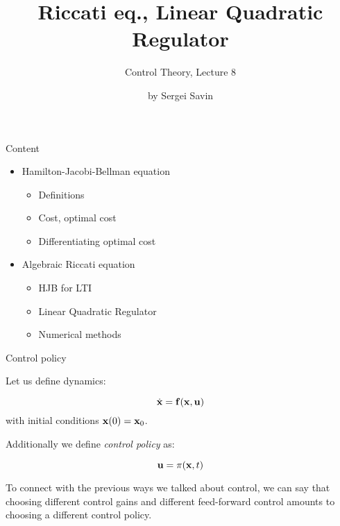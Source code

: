 \documentclass{beamer}
\title{Riccati eq., Linear Quadratic Regulator}
\subtitle{Control Theory, Lecture 8}
\author{by Sergei Savin}
\date{\mydate}
\begin{document}
\maketitle


\begin{frame}{Content}
\begin{itemize}
\item Hamilton-Jacobi-Bellman equation
\begin{itemize}
    \item Definitions
    \item Cost, optimal cost
    \item Differentiating optimal cost
\end{itemize}
\item Algebraic Riccati equation
\begin{itemize}
    \item HJB for LTI
    \item Linear Quadratic Regulator
    \item Numerical methods
\end{itemize}
\end{itemize}
\end{frame}

\begin{frame}{Control policy}
\begin{flushleft}

Let us define dynamics:

\begin{equation}
    \dot {\mathbf{x}} = \mathbf{f} (\mathbf{x}, \mathbf{u})
\end{equation}
%
with initial conditions $\mathbf{x}(0)=\mathbf{x}_0$. 

\bigskip

Additionally we define \emph{control policy} as:

\begin{equation}
    \mathbf{u} = \pi (\mathbf{x}, t)
\end{equation}

To connect with the previous ways we talked about control, we can say that choosing different control gains and different feed-forward control amounts to choosing a different control policy.

\end{flushleft}
\end{frame}
\end{document}
